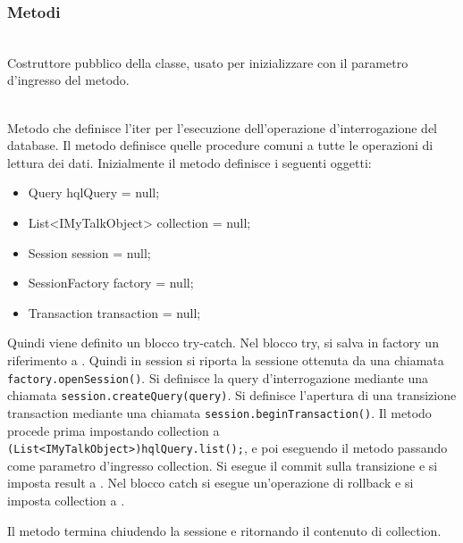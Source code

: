 \subsubsection*{Metodi}

\begin{description}
	\item{}\\
	Costruttore pubblico della classe, usato per inizializzare  con il parametro d'ingresso del metodo.
	
	\item{}\\
	Metodo che definisce l'iter per l'esecuzione dell'operazione d'interrogazione del database. Il metodo definisce quelle procedure comuni a tutte le operazioni di lettura dei dati. Inizialmente il metodo definisce i seguenti oggetti:
	\begin{itemize}
		\item Query hqlQuery = null;
		\item List<IMyTalkObject> collection = null;
		\item Session session = null;
		\item SessionFactory factory = null;
		\item Transaction transaction = null;
	\end{itemize}
	
Quindi viene definito un blocco try-catch. Nel blocco try, si salva in factory un riferimento a . Quindi in session si riporta la sessione ottenuta da una chiamata \verb|factory.openSession()|. Si definisce la query d'interrogazione mediante una chiamata \verb|session.createQuery(query)|. Si definisce l'apertura di una transizione transaction mediante una chiamata \verb|session.beginTransaction()|. Il metodo procede prima impostando collection a \verb|(List<IMyTalkObject>)hqlQuery.list();|, e poi eseguendo il metodo  passando come parametro d'ingresso collection. Si esegue il commit sulla transizione e si imposta result a . Nel blocco catch si esegue un'operazione di rollback e si imposta collection a .

Il metodo termina chiudendo la sessione e ritornando il contenuto di collection.


\end{description}
